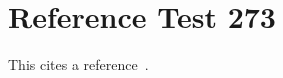 \documentclass{article}
\begin{document}
\section{Reference Test 273}
This cites a reference~\cite{test273}.

\end{document}
